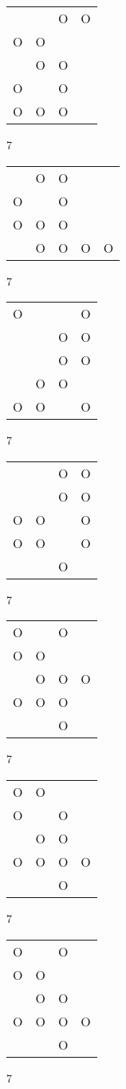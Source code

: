 \begin{tabular}{|m{0.2cm}m{0.2cm}m{0.2cm}m{0.2cm}|}\hline
 & &O&O\\
O&O& & \\
 &O&O& \\
O& &O& \\
O&O&O& \\
\hline\end{tabular}7
\begin{tabular}{|m{0.2cm}m{0.2cm}m{0.2cm}m{0.2cm}m{0.2cm}|}\hline
 &O&O& & \\
O& &O& & \\
O&O&O& & \\
 &O&O&O&O\\
\hline\end{tabular}7
\begin{tabular}{|m{0.2cm}m{0.2cm}m{0.2cm}m{0.2cm}|}\hline
O& & &O\\
 & &O&O\\
 & &O&O\\
 &O&O& \\
O&O& &O\\
\hline\end{tabular}7
\begin{tabular}{|m{0.2cm}m{0.2cm}m{0.2cm}m{0.2cm}|}\hline
 & &O&O\\
 & &O&O\\
O&O& &O\\
O&O& &O\\
 & &O& \\
\hline\end{tabular}7
\begin{tabular}{|m{0.2cm}m{0.2cm}m{0.2cm}m{0.2cm}|}\hline
O& &O& \\
O&O& & \\
 &O&O&O\\
O&O&O& \\
 & &O& \\
\hline\end{tabular}7
\begin{tabular}{|m{0.2cm}m{0.2cm}m{0.2cm}m{0.2cm}|}\hline
O&O& & \\
O& &O& \\
 &O&O& \\
O&O&O&O\\
 & &O& \\
\hline\end{tabular}7
\begin{tabular}{|m{0.2cm}m{0.2cm}m{0.2cm}m{0.2cm}|}\hline
O& &O& \\
O&O& & \\
 &O&O& \\
O&O&O&O\\
 & &O& \\
\hline\end{tabular}7

